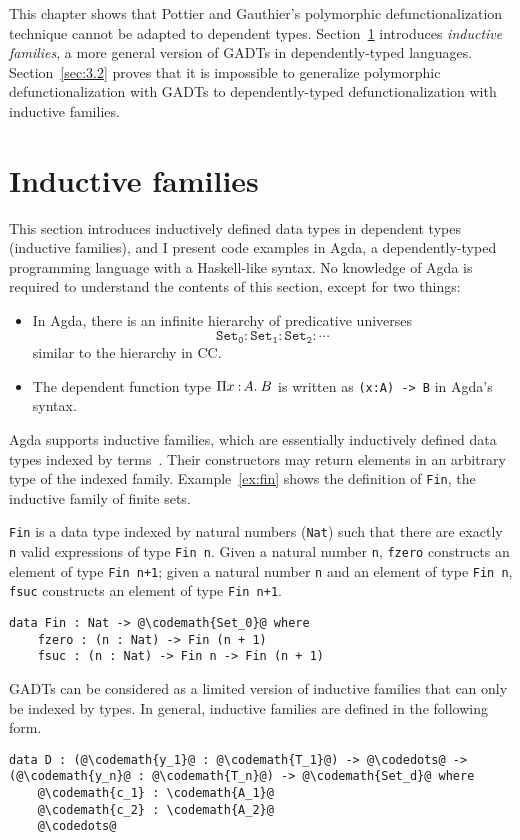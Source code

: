 
This chapter shows that Pottier and Gauthier's polymorphic defunctionalization technique cannot be adapted to dependent types. Section~\ref{sec:3.1} introduces \textit{inductive families}, a more general version of GADTs in dependently-typed languages. Section~\ref{sec:3.2} proves that it is impossible to generalize polymorphic defunctionalization with GADTs to dependently-typed defunctionalization with inductive families.

\section{Inductive families}
\label{sec:3.1}

This section introduces inductively defined data types in dependent types (inductive families), and I present code examples in Agda, a dependently-typed programming language with a Haskell-like syntax. No knowledge of Agda is required to understand the contents of this section, except for two things:
\begin{itemize}
  \item In Agda, there is an infinite hierarchy of predicative universes \[ \mathtt{Set_0 : Set_1 : Set_2 : \cdots} \] similar to the hierarchy in CC.
  \item The dependent function type $\Pi x\mkern1.5mu{\hspace{0.5mm}{:}\hspace{0.5mm}} A.\hspace{0.8mm}B$ is written as \texttt{(x:A) -> B} in Agda's syntax.
\end{itemize}

Agda supports inductive families, which are essentially inductively defined data types indexed by terms~\cite{AgdaDoc}. Their constructors may return elements in an arbitrary type of the indexed family. Example~\ref{ex:fin} shows the definition of \texttt{Fin}, the inductive family of finite sets.

\begin{exmp} \texttt{Fin} is a data type indexed by natural numbers (\texttt{Nat}) such that there are exactly \texttt{n} valid expressions of type \texttt{Fin n}. Given a natural number \texttt{n}, \texttt{fzero} constructs an element of type \texttt{Fin n+1}; given a natural number \texttt{n} and an element of type \texttt{Fin n}, \texttt{fsuc} constructs an element of type \texttt{Fin n+1}.
\begin{lstlisting}[escapechar=@]
data Fin : Nat -> @\codemath{Set_0}@ where
    fzero : (n : Nat) -> Fin (n + 1)
    fsuc : (n : Nat) -> Fin n -> Fin (n + 1)
\end{lstlisting}
\label{ex:fin}
\end{exmp}
GADTs can be considered as a limited version of inductive families that can only be indexed by types. In general, inductive families are defined in the following form.
\begin{lstlisting}[escapechar=@]
data D : (@\codemath{y_1}@ : @\codemath{T_1}@) -> @\codedots@ -> (@\codemath{y_n}@ : @\codemath{T_n}@) -> @\codemath{Set_d}@ where
    @\codemath{c_1} : \codemath{A_1}@
    @\codemath{c_2} : \codemath{A_2}@
    @\codedots@ 
\end{lstlisting}

